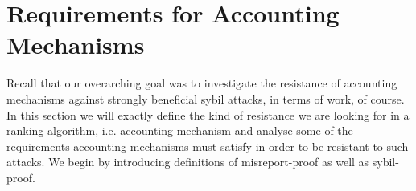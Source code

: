 \documentclass[11pt,a4paper]{article}
\theoremstyle{definition}
\theoremstyle{theorem}
\theoremstyle{proposition}
\theoremstyle{corollary}
\theoremstyle{lemma}
\theoremstyle{example}
\theoremstyle{remark}
\begin{document}

\section{Requirements for Accounting Mechanisms}
\label{sec:Requirements for Accounting Mechanisms}
Recall that our overarching goal was to investigate the resistance of accounting mechanisms against strongly beneficial sybil attacks, in terms of work, of course. In this section we will exactly define the kind of resistance we are looking for in a ranking algorithm, i.e. accounting mechanism and analyse some of the requirements accounting mechanisms must satisfy in order to be resistant to such attacks. We begin by introducing definitions of misreport-proof as well as sybil-proof.
\end{document}
